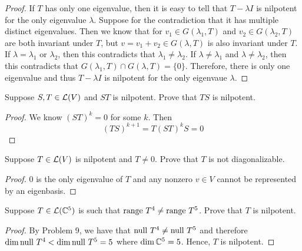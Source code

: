 \documentclass{extarticle}
\begin{document}
\begin{proof}
If \(T\) has only one eigenvalue, then it is easy to tell that \(T - \lambda I\) is nilpotent 
for the only eigenvalue \(\lambda\). Suppose for the contradiction that it has multiple 
distinct eigenvalues. Then we know that for \(v_1 \in G(\lambda_1, T)\) and \(v_2 \in G(\lambda_2, T)\)
are both invariant under \(T\), but \(v = v_1 + v_2 \in G(\lambda, T)\) is also invariant under 
\(T\). If \(\lambda = \lambda_1\) or 
\(\lambda_2\), then this contradicts that \(\lambda_1 \neq \lambda_2\). If \(\lambda \neq \lambda_1\)
and \(\lambda \neq \lambda_2\), then this contradicts that \(G(\lambda_1, T) \cap G(\lambda, T) = \{0\}\).
Therefore, there is only one eigenvalue and thus \(T - \lambda I\) is nilpotent for the only 
eigenvaue \(\lambda\). 
\end{proof}

\begin{problem}{13}
    Suppose \(S, T \in \mathcal{L}(V)\) and \(ST\) is nilpotent. Prove that \(TS\) is nilpotent. 
\end{problem}

\begin{proof}
We know \((ST)^k = 0\) for some \(k\). Then 
\[(TS)^{k+1} = T(ST)^kS = 0\]
\end{proof}

\begin{problem}{14}
    Suppose \(T \in \mathcal{L}(V)\) is nilpotent and \(T \neq 0\). Prove that \(T\) is not 
    diagonalizable.
\end{problem}

\begin{proof}
\(0\) is the only eigenvalue of \(T\) and any nonzero \(v \in V\) cannot be represented by an eigenbasis.
\end{proof}

\begin{problem}{22}
    Suppose \(T \in \mathcal{L}(\mathbb{C}^5)\) is such that \(\text{range } T^4 \neq \text{range } T^5\). Prove that 
    \(T\) is nilpotent. 
\end{problem}

\begin{proof}
By Problem 9, we have that \(\text{null } T^4 \neq \text{null } T^5 \) and therefore \(\dim \text{null } T^4 < 
\dim \text{null } T^5 = 5\) where \(\dim \mathbb{C}^5 =5 \). Hence, \(T\) is nilpotent. 
\end{proof}

\end{document}
